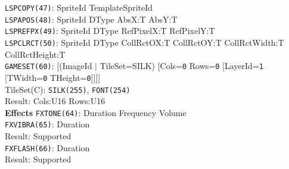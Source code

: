 \documentclass[a4paper,twocolumn,11pt]{article}
\begin{document}
\begin{flushleft}
\vskip 4pt
{\tt LSPCOPY(47)}: SpriteId TemplateSpriteId \\
\vskip 4pt
{\tt LSPAPOS(48)}: SpriteId DType AbsX:T AbsY:T \\
\vskip 4pt
{\tt LSPREFPX(49)}: SpriteId DType RefPixelX:T RefPixelY:T \\
\vskip 4pt
{\tt LSPCLRCT(50)}: SpriteId DType CollRctOX:T CollRctOY:T CollRctWidth:T CollRctHeight:T \\
\vskip 4pt
{\tt GAMESET(60)}: [(ImageId $|$ TileSet=SILK) [Cols={\tt 0} Rows={\tt 0} [LayerId={\tt 1} [TWidth={\tt 0} THeight={\tt 0}]]]] \\
TileSet(C): {\tt SILK(255)}, {\tt FONT(254)} \\
Result: Cols:U16 Rows:U16 \\
\vskip 6pt
{\bf Effects}
\vskip 2pt
{\tt FXTONE(64)}: Duration Frequency Volume \\
\vskip 4pt
{\tt FXVIBRA(65)}: Duration \\
Result: Supported \\
\vskip 4pt
{\tt FXFLASH(66)}: Duration \\
Result: Supported \\
\vskip 4pt
\end{flushleft}
\end{document}

